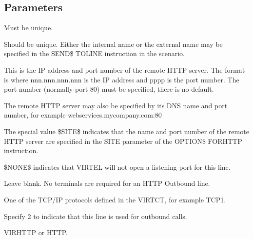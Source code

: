 \documentclass[letterpaper,10pt,english]{sphinxmanual}
\begin{document}
\sphinxAtStartPar
{}

\ignorespaces 

\subsection{Parameters}
\label{\detokenize{connectivity_guide:index-16}}\label{\detokenize{connectivity_guide:id2}}\begin{description}
\sphinxAtStartPar
Must be unique.

\sphinxAtStartPar
Should be unique. Either the internal name or the external name may be specified in the SEND\$ TO\sphinxhyphen{}LINE instruction in the scenario.

\sphinxAtStartPar
This is the IP address and port number of the remote HTTP server. The format is  where nnn.nnn.nnn.nnn is the
IP address and pppp is the port number. The port number (normally port 80) must be specified, there is no default.

\sphinxAtStartPar
The remote HTTP server may also be specified by its DNS name and port number, for example webservices.mycompany.com:80

\sphinxAtStartPar
The special value \$SITE\$ indicates that the name and port number of the remote HTTP server are specified in the SITE parameter of the OPTION\$ FOR\sphinxhyphen{}HTTP instruction.

\sphinxAtStartPar
\$NONE\$ indicates that VIRTEL will not open a listening port for this line.

\sphinxAtStartPar
Leave blank. No terminals are required for an HTTP Outbound line.

\sphinxAtStartPar
One of the TCP/IP protocols defined in the VIRTCT, for example TCP1.

\sphinxAtStartPar
Specify 2 to indicate that this line is used for outbound calls.

\sphinxAtStartPar
VIRHTTP or HTTP.

\end{description}
\end{document}
